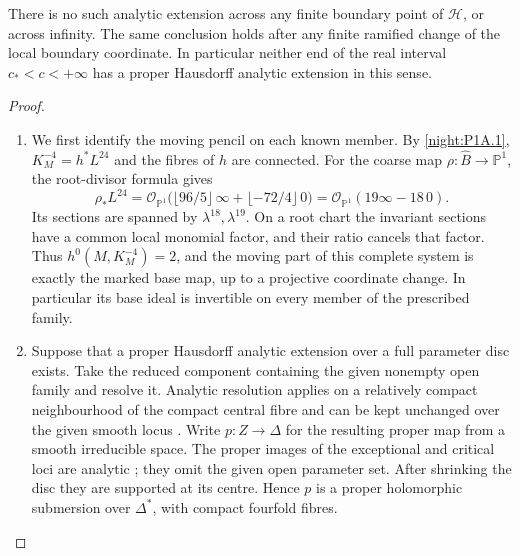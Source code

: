 \begin{theorem}\hypertarget{tag-02R5}{}\label{night:P1A.5}
There is no such analytic extension across any finite boundary
point of $\mathcal H$, or across infinity. The same conclusion
holds after any finite ramified change of the local boundary
coordinate. In particular neither end of the real interval
$c_*<c<+\infty$ has a proper Hausdorff analytic extension in
this sense.
\end{theorem}
\begin{proof}
\begin{enumerate}[label={$\langle1\rangle$\arabic*.}]
\item We first identify the moving pencil on each known member.
By \cref{night:P1A.1}, $K_M^{-4}=h^*L^{24}$ and the fibres of $h$
are connected.  For the coarse map
$\rho:\widehat B\to\mathbb P^1$, the root-divisor formula gives
\[
 \rho_*L^{24}
 =\mathcal O_{\mathbb P^1}
   \bigl(\lfloor96/5\rfloor\,\infty+
                \lfloor-72/4\rfloor\,0\bigr)
 =\mathcal O_{\mathbb P^1}(19\infty-18\,0).
\]
Its sections are spanned by $\lambda^{18},\lambda^{19}$.
On a root chart the invariant sections have a common local
monomial factor, and their ratio cancels that factor.  Thus
$h^0(M,K_M^{-4})=2$, and the moving part of this complete
system is exactly the marked base map, up to a projective
coordinate change.  In particular its base ideal is invertible
on every member of the prescribed family.

\item Suppose that a proper Hausdorff analytic extension over a full
parameter disc exists.  Take the reduced component containing
the given nonempty open family and resolve it.  Analytic
resolution applies on a relatively compact neighbourhood of
the compact central fibre and can be kept unchanged over the
given smooth locus
\cite[Theorem 1.6 and its following analytic-neighbourhood
paragraph, preprint p.~5]{BM97}.
Write $p:Z\to\Delta$ for the resulting proper map from a smooth
irreducible space.  The proper images of the exceptional and
critical loci are analytic
\cite[\S7, Satz 1, p.~60]{Grauert60}; they omit the given open
parameter set.  After shrinking the disc they are supported
at its centre.  Hence $p$ is a proper holomorphic submersion
over $\Delta^*$, with compact fourfold fibres.


\end{enumerate}
\end{proof}
